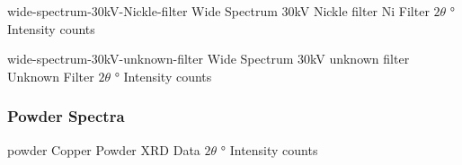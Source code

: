 \documentclass{WitsPhysicsReport}
\begin{document}
\lipsum[20]

                 {wide-spectrum-30kV-Nickle-filter} %
                 {Wide Spectrum 30kV Nickle filter} %
                 {Ni Filter} %
                 {$2 \theta$} %
                 {\si{\degree}} %
                 {Intensity} %
                 {counts} %
                 {%
                 }

                              {wide-spectrum-30kV-unknown-filter} %
                              {Wide Spectrum 30kV unknown filter} %
                              {Unknown Filter} %
                              {$2 \theta$} %
                              {\si{\degree}} %
                              {Intensity} %
                              {counts} %
                              {%
                              }

\lipsum[18]

\subsubsection{Powder Spectra}
\label{subsubsec:Powder_Spectra}

\lipsum[19]

                 {powder} %
                 {Copper Powder XRD} %
                 {Data}
                 {$2 \theta$} %
                 {\si{\degree}} %
                 {Intensity} %
                 {counts} %
                 {%
                 }
\end{document}
